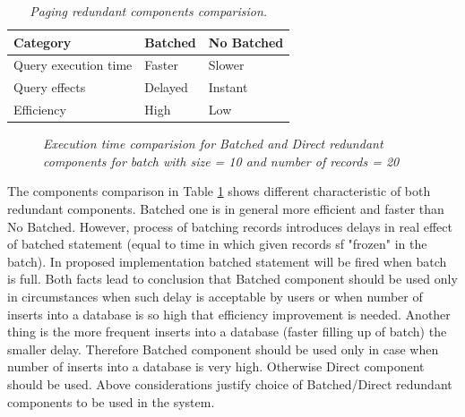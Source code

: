 \documentclass[10pt,a4paper]{article}
\begin{document}
\begin{table}[!htb]
\def\arraystretch{1.5}
\caption{\textit{Paging redundant components comparision.}}\label{batchedcomponents}
\begin{tabularx}{\textwidth}{p{3cm}|X|X}
  \textbf{Category} &\textbf{Batched} & \textbf{No Batched} \\
\hline
Query execution time & Faster & Slower \\
Query effects & Delayed & Instant\\
Efficiency & High & Low\\
\end{tabularx}
\end{table}

\begin{figure}[!htb]
\centering
{}
\caption{\textit{Execution time comparision for Batched and Direct redundant components for batch with size = 10 and number of records = 20}} \label{fig:batchedtime}
\end{figure}

The components comparison in Table \ref{batchedcomponents} shows different characteristic of both redundant components. Batched one is in general more efficient and faster than No Batched. However, process of batching records introduces delays in real effect of batched statement (equal to time in which given records sf "frozen" in the batch). In proposed implementation batched statement will be fired when batch is full. Both facts lead to conclusion that Batched component should be used only in circumstances when such delay is acceptable by users or when number of inserts into a database is so high that efficiency improvement is needed. Another thing is the more frequent inserts into a database (faster filling up of batch) the smaller delay. Therefore Batched component should be used only in case when number of inserts into a database is very high. Otherwise Direct component should be used. Above considerations justify choice of Batched/Direct redundant components to be used in the system.   
\end{document}
